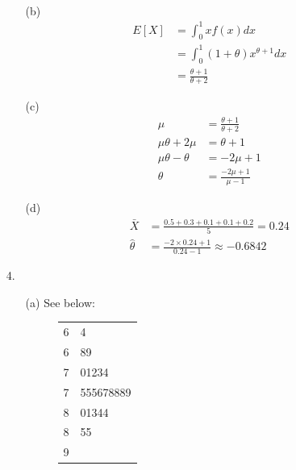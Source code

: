 \documentclass{article}
\begin{document}
\begin{enumerate}
\begin{enumerate}
\begin{equation*}
\begin{aligned}
        \end{aligned}
        \end{equation*}
    \item [(b)]
        \begin{equation*}
        \begin{aligned}
        E[X] &= \int_0^1 xf(x) dx \\
        &= \int_0^1 (1 + \theta)x^{\theta + 1} dx \\
        &= \frac{\theta + 1}{\theta + 2}
        \end{aligned}
        \end{equation*}
    \item [(c)]
        \begin{equation*}
        \begin{aligned}
        \mu &= \frac{\theta + 1}{\theta + 2} \\
        \mu\theta + 2\mu &= \theta + 1 \\
        \mu\theta - \theta &= -2\mu + 1 \\
        \theta &= \frac{-2\mu + 1}{\mu - 1}
        \end{aligned}
        \end{equation*}
    \item [(d)]
        \begin{equation*}
        \begin{aligned}
        \bar{X} &= \frac{0.5 + 0.3 + 0.1 + 0.1 + 0.2}{5} = 0.24 \\
        \hat{\theta} &= \frac{-2 \times 0.24 + 1}{0.24 - 1} \approx -0.6842
        \end{aligned}
        \end{equation*}
    \end{enumerate}
\item [4.]
    \begin{enumerate}
    \item [(a)] See below:
        \begin{figure}[h]
        \begin{center}
        \begin{tabular}{ r | l }
        6 & 4 \\
        6 & 89 \\
        7 & 01234 \\
        7 & 555678889 \\
        8 & 01344 \\
        8 & 55 \\
        9 &  \\

\end{tabular}
\end{center}
\end{figure}
\end{enumerate}
\end{enumerate}
\end{document}
